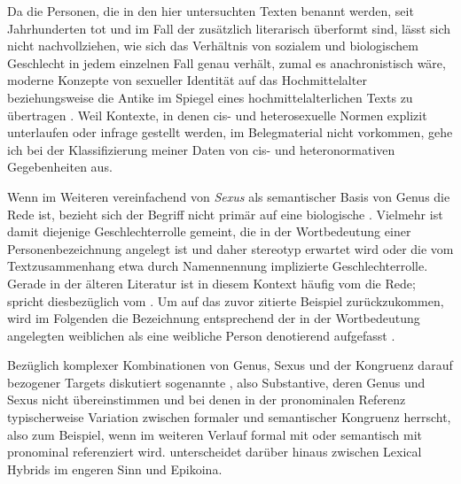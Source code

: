 Da die Personen, die in den hier untersuchten Texten benannt werden, seit
Jahrhunderten tot und im Fall der \KC{} zusätzlich literarisch überformt sind,
lässt sich nicht nachvollziehen, wie sich das Verhältnis von sozialem und
biologischem Geschlecht in jedem einzelnen Fall
genau verhält, zumal es anachronistisch wäre, moderne Konzepte von sexueller
Identität auf das Hochmittelalter beziehungsweise die Antike im Spiegel eines
hochmittelalterlichen Texts zu übertragen \autocite[siehe
z.\,B.][]{klinger2002}. Weil Kontexte, in denen cis- und heterosexuelle Normen
explizit unterlaufen oder infrage gestellt werden, im Belegmaterial nicht
vorkommen, gehe ich bei der Klassifizierung meiner Daten von cis- und
heteronormativen Gegebenheiten aus.

Wenn im Weiteren vereinfachend von \textit{Sexus} als semantischer Basis von
Genus die Rede ist, bezieht sich der Begriff nicht primär auf eine
biologische . Vielmehr ist damit
diejenige Geschlechter\-rolle gemeint, die in der
Wortbedeutung einer Personenbezeichnung angelegt ist und daher stereotyp
erwartet wird oder die vom Textzusammenhang etwa durch Namennennung implizierte
Geschlechterrolle. Gerade in der älteren Literatur ist in
diesem Kontext häufig vom  die Rede;
\citet[67]{panther2009} spricht diesbezüglich vom
. Um auf das zuvor zitierte Beispiel zurückzukommen,
wird im Folgenden die Bezeichnung  entsprechend der in der
Wortbedeutung angelegten weiblichen  als eine weibliche
Person denotierend aufgefasst
\autocite[vgl.][s.\,v.~]{duden-online}.


Bezüglich komplexer Kombinationen von Genus, Sexus und der Kongruenz darauf
bezogener Targets diskutiert \citet[183--184]{corbett1991} sogenannte
, also Substantive, deren Genus und
Sexus nicht übereinstimmen und bei denen in der pronominalen Referenz
typischerweise Variation zwischen formaler und semantischer Kongruenz herrscht,
also zum Beispiel, wenn  im weiteren Verlauf formal mit 
oder semantisch mit  pronominal referenziert wird. \citet{klein2022}
unterscheidet darüber hinaus zwischen Lexical Hybrids im
engeren Sinn und Epikoina.


